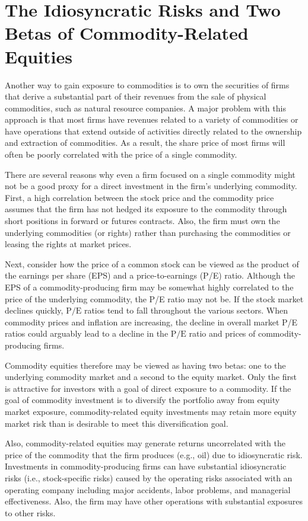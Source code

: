 \documentclass[11pt]{article}
\begin{document}
\section*{The Idiosyncratic Risks and Two Betas of Commodity-Related Equities}
Another way to gain exposure to commodities is to own the securities of firms that derive a substantial part of their revenues from the sale of physical commodities, such as natural resource companies. A major problem with this approach is that most firms have revenues related to a variety of commodities or have operations that extend outside of activities directly related to the ownership and extraction of commodities. As a result, the share price of most firms will often be poorly correlated with the price of a single commodity.

There are several reasons why even a firm focused on a single commodity might not be a good proxy for a direct investment in the firm's underlying commodity. First, a high correlation between the stock price and the commodity price assumes that the firm has not hedged its exposure to the commodity through short positions in forward or futures contracts. Also, the firm must own the underlying commodities (or rights) rather than purchasing the commodities or leasing the rights at market prices.

Next, consider how the price of a common stock can be viewed as the product of the earnings per share (EPS) and a price-to-earnings (P/E) ratio. Although the EPS of a commodity-producing firm may be somewhat highly correlated to the price of the underlying commodity, the P/E ratio may not be. If the stock market declines quickly, $\mathrm{P} / \mathrm{E}$ ratios tend to fall throughout the various sectors. When commodity prices and inflation are increasing, the decline in overall market P/E ratios could arguably lead to a decline in the $\mathrm{P} / \mathrm{E}$ ratio and prices of commodity-producing firms.

Commodity equities therefore may be viewed as having two betas: one to the underlying commodity market and a second to the equity market. Only the first is attractive for investors with a goal of direct exposure to a commodity. If the goal of commodity investment is to diversify the portfolio away from equity market exposure, commodity-related equity investments may retain more equity market risk than is desirable to meet this diversification goal.

Also, commodity-related equities may generate returns uncorrelated with the price of the commodity that the firm produces (e.g., oil) due to idiosyncratic risk. Investments in commodity-producing firms can have substantial idiosyncratic risks (i.e., stock-specific risks) caused by the operating risks associated with an operating company including major accidents, labor problems, and managerial effectiveness. Also, the firm may have other operations with substantial exposures to other risks.
\end{document}
